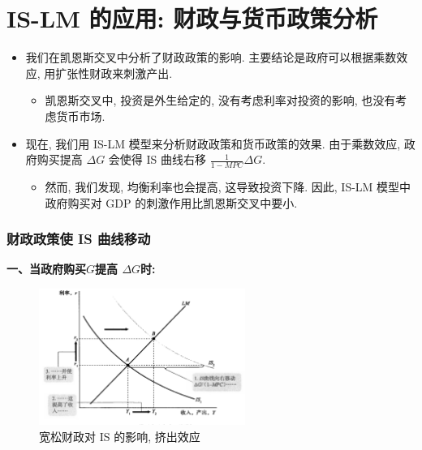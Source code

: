 \documentclass[]{ctexart}
\begin{document}
\section*{IS-LM 的应用:  财政与货币政策分析}


\begin{itemize}
\item
  我们在凯恩斯交叉中分析了财政政策的影响. 主要结论是政府可以根据乘数效应,  用扩张性财政来刺激产出. 

  \begin{itemize}
  \item
    凯恩斯交叉中,  投资是外生给定的,  没有考虑利率对投资的影响,  也没有考虑货币市场. 
  \end{itemize}
\item
  现在,  我们用 IS-LM
  模型来分析财政政策和货币政策的效果. 由于乘数效应,  政府购买提高
  \(\Delta G\) 会使得 IS 曲线右移 \(\frac{1}{1 - MPC} \Delta G\).

  \begin{itemize}
  \item
    然而,  我们发现, 均衡利率也会提高,  这导致投资下降. 
    因此,   IS-LM 模型中政府购买对 GDP 的刺激作用比凯恩斯交叉中要小. 
  \end{itemize}
\end{itemize}

\subsubsection*{财政政策使 IS 曲线移动}

\textbf{一、当政府购买$G$提高 \(\Delta G\)时:} 

\begin{figure}
\centering
\includegraphics[width=0.6\textwidth]{fig2/is-1.jpeg}
\caption{宽松财政对 IS 的影响,  挤出效应}
\end{figure}
\end{document}

